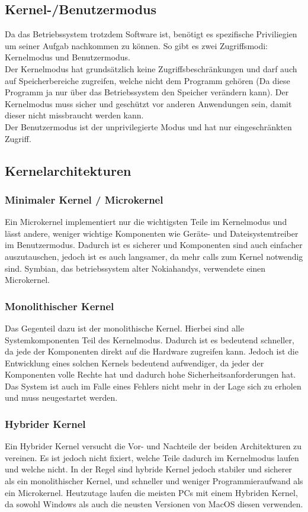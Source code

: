 \documentclass{article}
\begin{document}
	\subsection{Kernel-/Benutzermodus}
	Da das Betriebssystem trotzdem Software ist, benötigt es spezifische Priviliegien um seiner Aufgab nachkommen zu können. So gibt es zwei Zugriffsmodi: Kernelmodus und Benutzermodus. \\
	Der Kernelmodus hat grundsätzlich keine Zugriffsbeschränkungen und darf auch auf Speicherbereiche zugreifen, welche nicht dem Programm gehören (Da diese Programm ja nur über das Betriebssystem den Speicher verändern kann). Der Kernelmodus muss sicher und geschützt vor anderen Anwendungen sein, damit dieser nicht missbraucht werden kann. \\
	Der Benutzermodus ist der unprivilegierte Modus und hat nur eingeschränkten Zugriff.
	\subsection{Kernelarchitekturen}
	\subsubsection{Minimaler Kernel / Microkernel}
	Ein Microkernel implementiert nur die wichtigsten Teile im Kernelmodus und lässt andere, weniger wichtige Komponenten wie Geräte- und Dateisystemtreiber im Benutzermodus. Dadurch ist es sicherer und Komponenten sind auch einfacher auszutauschen, jedoch ist es auch langsamer, da mehr calls zum Kernel notwendig sind. Symbian, das betriebssystem alter Nokiahandys, verwendete einen Microkernel.
	\subsubsection{Monolithischer Kernel}
	Das Gegenteil dazu ist der monolithische Kernel. Hierbei sind alle Systemkomponenten Teil des Kernelmodus. Dadurch ist es bedeutend schneller, da jede der Komponenten direkt auf die Hardware zugreifen kann. Jedoch ist die Entwicklung eines solchen Kernels bedeutend aufwendiger, da jeder der Komponenten volle Rechte hat und dadurch hohe Sicherheitsanforderungen hat. Das System ist auch im Falle eines Fehlers nicht mehr in der Lage sich zu erholen und muss neugestartet werden.
	\subsubsection{Hybrider Kernel}
	Ein Hybrider Kernel versucht die Vor- und Nachteile der beiden Architekturen zu vereinen. Es ist jedoch nicht fixiert, welche Teile dadurch im Kernelmodus laufen und welche nicht. In der Regel sind hybride Kernel jedoch stabiler und sicherer als ein monolithischer Kernel, und schneller und weniger Programmieraufwand als ein Microkernel. Heutzutage laufen die meisten PCs mit einem Hybriden Kernel, da sowohl Windows als auch die neusten Versionen von MacOS diesen verwenden.
\end{document}
